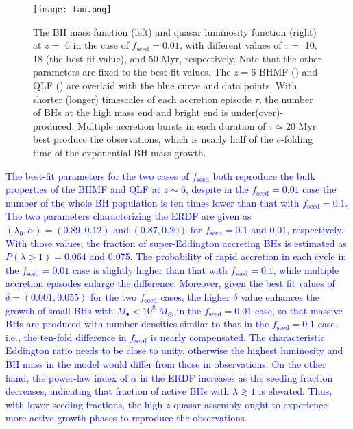 \documentclass[twocolumn, twocolappendix]{aastex63}
\newcommand{\Msun}{M_\odot}
\newcommand{\tlife}{\tau}
\newcommand{\fseed}{f_\mathrm{seed}}
\newcommand{\blue}[1]{\textcolor{blue}{ #1}}
\begin{document}
\begin{CJK*}{UTF8}{gbsn}
\begin{figure*}
\centering
\texttt{[image: tau.png]}
\caption{
The BH mass function (left) and quasar luminosity function (right) at $z=$ 6 in the case of $\fseed=0.01$, 
with different values of $\tlife=$ 10, 18 (the best-fit value), and 50 Myr, respectively.
Note that the other parameters are fixed to the best-fit values. 
The $z=6$ BHMF () and QLF () 
are overlaid with the blue curve and data points.
With shorter (longer) timescales of each accretion episode $\tlife$, the number of BHs at the high mass end and bright end is under(over)-produced.
Multiple accretion bursts in each duration of $\tau \simeq 20$ Myr best produce the observations,
which is nearly half of the $e$-folding time of the exponential BH mass growth.
}
\label{fig:tau}
\vspace{4mm}
\end{figure*}

\blue{
The best-fit parameters for the two cases of $\fseed$ both reproduce the bulk properties of the BHMF and QLF at $z\sim 6$,
despite in the $\fseed=0.01$ case the number of the whole BH population is ten times lower than that with $\fseed=0.1$.
The two parameters characterizing the ERDF are given as
$(\lambda_0,\alpha) = (0.89,0.12)$ and $(0.87,0.20)$ for $\fseed=0.1$ and $0.01$, respectively.
With those values, the fraction of super-Eddington accreting BHs is estimated as $P(\lambda>1)=0.064$ and 0.075. 
The probability of rapid accretion in each cycle in the $\fseed=0.01$ case is slightly higher than that with $\fseed=0.1$,
while multiple accretion episodes enlarge the difference.
Moreover, given the best fit values of $\delta=(0.001,0.055)$ for the two $\fseed$ cases,
the higher $\delta$ value enhances the growth of small BHs with $M_\bullet <10^8~\Msun$ in the $\fseed=0.01$ case,
so that massive BHs are produced with number densities similar to that in the $\fseed=0.1$ case,
i.e., the ten-fold difference in $\fseed$ is nearly compensated.
The characteristic Eddington ratio needs to be close to unity, otherwise the highest luminosity and BH mass
in the model would differ from those in observations.
On the other hand, the power-law index of $\alpha$ in the ERDF increases as the seeding fraction decreases,
indicating that fraction of active BHs with $\lambda \gtrsim 1$ is elevated. 
Thus, with lower seeding fractions, the high-$z$ quasar assembly ought to experience more active growth phases to reproduce the observations.
}


\end{CJK*}
\end{document}
